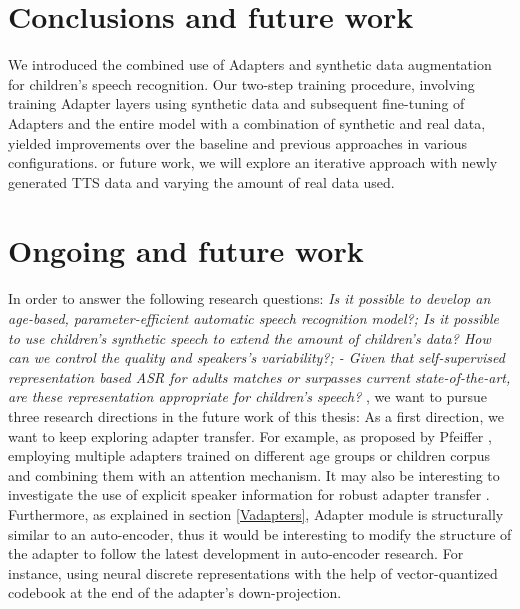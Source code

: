\section{Conclusions and future work}
\label{section:conclusions_tts}
We introduced the combined use of Adapters and synthetic data augmentation for children's speech recognition. Our two-step training procedure, involving training Adapter layers %
using synthetic data and subsequent fine-tuning of Adapters and the entire model with a combination of synthetic and real data, yielded improvements over the baseline and previous approaches in various configurations.
or future work, we will explore an iterative approach with newly generated TTS data and varying the amount of real data used.%

\section{Ongoing and future work} %
\label{section:ongoing}
In order to answer the following research questions: \textit{Is it possible to develop an age-based, parameter-efficient automatic speech recognition model?; Is it possible to use children's synthetic speech to extend the amount of children's data? How can we control the quality and speakers’s variability?; - Given that self-supervised representation based ASR for adults matches or surpasses current state-of-the-art, are these representation appropriate for children’s speech? },
we want to pursue three research directions in the future work of this thesis: As a first direction, we want to keep exploring adapter transfer. For example, as proposed by Pfeiffer \cite{pfeiffer2020adapterfusion}, employing multiple adapters trained on different age groups or children corpus and combining them with an attention mechanism. It may also be interesting to investigate the use of explicit speaker information for robust adapter transfer \cite{gong2022layer}. Furthermore, as explained in section \ref{Vadapters}, Adapter module is structurally similar to an auto-encoder, thus it would be interesting to modify the structure of the adapter to follow the latest development in auto-encoder research. For instance, using neural discrete representations with the help of vector-quantized codebook\cite{van2017neural} at the end of the adapter's down-projection.

